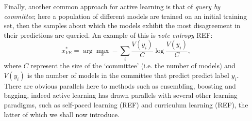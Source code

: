Finally, another common approach for active learning is that of \textit{query by committee}; here a population of different models are trained on an initial training set, then the samples about which the models exhibit the most disagreement in their predictions are queried. An example of this is \textit{vote entropy} REF:
\begin{equation}
x_{VE}^{*} = \arg\max_{x} - \sum_{i} \frac{V(y_i)}{C} \log \frac{V(y_i)}{C},
\end{equation}
where $C$ represent the size of the `committee' (i.e. the number of models) and $V(y_i)$ is the number of models in the committee that predict predict label $y_i$. There are obvious parallels here to methods such as ensembling, boosting and bagging, indeed active learning has drawn parallels with several other learning paradigms, such as self-paced learning (REF) and curriculum learning (REF), the latter of which we shall now introduce. 


